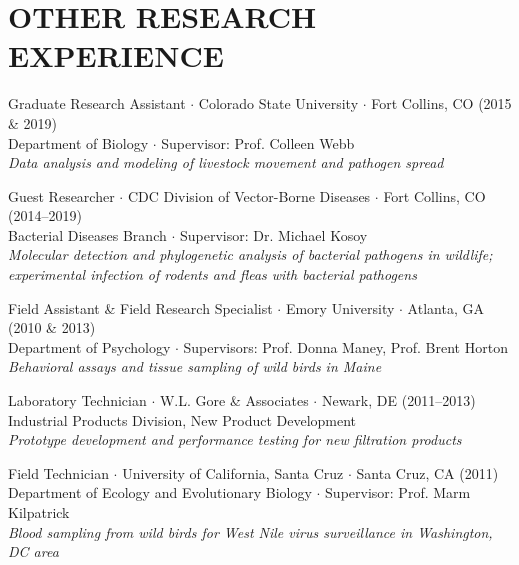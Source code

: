 \documentclass{cv}
\begin{document}

 \section*{OTHER RESEARCH EXPERIENCE}

 Graduate Research Assistant $\cdot$ Colorado State University $\cdot$ Fort Collins, CO (2015 \& 2019) \\
 Department of Biology $\cdot$ Supervisor: Prof. Colleen Webb \\
 \textit{Data analysis and modeling of livestock movement and pathogen spread}

 Guest Researcher $\cdot$ CDC Division of Vector-Borne Diseases $\cdot$ Fort Collins, CO (2014--2019) \\
 Bacterial Diseases Branch $\cdot$ Supervisor: Dr. Michael Kosoy \\
 \textit{Molecular detection and phylogenetic analysis of bacterial pathogens in wildlife; experimental infection of rodents and fleas with bacterial pathogens}

 Field Assistant \& Field Research Specialist $\cdot$ Emory University $\cdot$ Atlanta, GA (2010 \& 2013) \\
 Department of Psychology $\cdot$ Supervisors: Prof. Donna Maney, Prof. Brent Horton \\
 \textit{Behavioral assays and tissue sampling of wild birds in Maine}

 Laboratory Technician $\cdot$ W.L. Gore \& Associates $\cdot$ Newark, DE (2011--2013) \\
 Industrial Products Division, New Product Development \\
 \textit{Prototype development and performance testing for new filtration products}

 Field Technician $\cdot$ University of California, Santa Cruz $\cdot$ Santa Cruz, CA (2011) \\
 Department of Ecology and Evolutionary Biology $\cdot$ Supervisor: Prof. Marm Kilpatrick \\
 \textit{Blood sampling from wild birds for West Nile virus surveillance in Washington, DC area}

\end{document}
